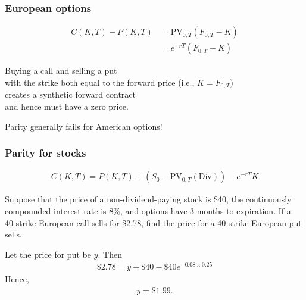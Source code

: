 \begin{frame}[fragile,t]
	\frametitle{European options}

	\begin{align*}
		C(K,T) - P(K,T) & = \text{PV}_{0,T} \left(F_{0,T}-K\right) \\
                    & = e^{-rT}\left(F_{0,T}-K\right)
	\end{align*}

	\pause
	\bigskip
	\begin{center}
		Buying a call and selling a put \\
		with the strike both equal to the forward price (i.e., $K=F_{0,T}$)\\
		creates a synthetic forward contract \\
		and hence must have a zero price.

		\pause
		\bigskip
		\mySeparateLine
		\bigskip

		Parity generally fails for American options!
	\end{center}
\end{frame}
\begin{frame}[fragile,t]
	\frametitle{Parity for stocks}
	\begin{align*}
		C(K,T) = P(K,T) + \left(S_0-\text{PV}_{0,T}(\text{Div})\right) - e^{-rT} K
	\end{align*}
\end{frame}
\begin{frame}[fragile,t]
	\begin{myexample}
		\label{Eg:9-1}
		Suppose that the price of a non-dividend-paying stock is \$40, the continuously compounded
		interest rate is 8\%, and options have 3 months to expiration. If a 40-strike European call
		sells for \$2.78, find the price for a 40-strike European put sells.
	\end{myexample}
	\bigskip
	\pause
	\begin{mysol}
		Let the price for put be $y$. Then
		\begin{align*}
			\$2.78 = y + \$40 - \$40e^{−0.08\times0.25}
		\end{align*}
		Hence,
		\begin{align*}
			y = \$1.99.
		\end{align*}
		\myEnd
	\end{mysol}
\end{frame}

